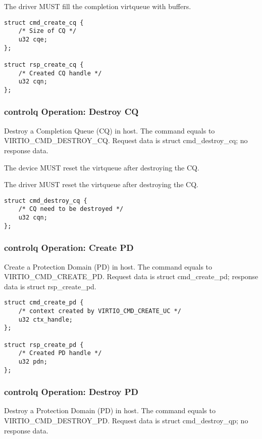 The driver MUST fill the completion virtqueue with buffers.

\begin{lstlisting}
struct cmd_create_cq {
    /* Size of CQ */
    u32 cqe;
};

struct rsp_create_cq {
    /* Created CQ handle */
    u32 cqn;
};
\end{lstlisting}

\subsubsection{controlq Operation: Destroy CQ}\label{sec:Device Types / RDMA Device / controlq Operation / Destroy CQ}

Destroy a Completion Queue (CQ) in host. The command equals to VIRTIO_CMD_DESTROY_CQ.
Request data is struct cmd_destroy_cq; no response data.

The device MUST reset the virtqueue after destroying the CQ.

The driver MUST reset the virtqueue after destroying the CQ.

\begin{lstlisting}
struct cmd_destroy_cq {
    /* CQ need to be destroyed */
    u32 cqn;
};
\end{lstlisting}

\subsubsection{controlq Operation: Create PD}\label{sec:Device Types / RDMA Device / controlq Operation / Create PD}

Create a Protection Domain (PD) in host. The command equals to VIRTIO_CMD_CREATE_PD.
Request data is struct cmd_create_pd; response data is struct rsp_create_pd.

\begin{lstlisting}
struct cmd_create_pd {
    /* context created by VIRTIO_CMD_CREATE_UC */
    u32 ctx_handle;
};

struct rsp_create_pd {
    /* Created PD handle */
    u32 pdn;
};
\end{lstlisting}

\subsubsection{controlq Operation: Destroy PD}\label{sec:Device Types / RDMA Device / controlq Operation / Destroy PD}

Destroy a Protection Domain (PD) in host. The command equals to VIRTIO_CMD_DESTROY_PD.
Request data is struct cmd_destroy_qp; no response data.

